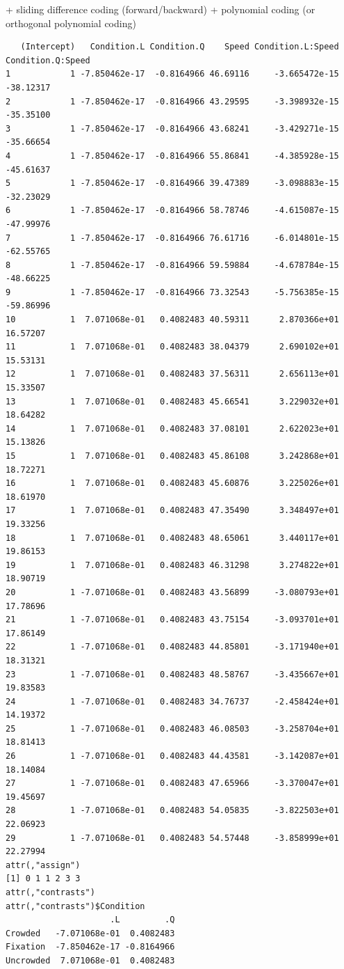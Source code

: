 \documentclass[
]{article}
\begin{document}
\normalsize + sliding difference coding (forward/backward) + polynomial
coding (or orthogonal polynomial coding)

\footnotesize

\begin{verbatim}
   (Intercept)   Condition.L Condition.Q    Speed Condition.L:Speed Condition.Q:Speed
1            1 -7.850462e-17  -0.8164966 46.69116     -3.665472e-15         -38.12317
2            1 -7.850462e-17  -0.8164966 43.29595     -3.398932e-15         -35.35100
3            1 -7.850462e-17  -0.8164966 43.68241     -3.429271e-15         -35.66654
4            1 -7.850462e-17  -0.8164966 55.86841     -4.385928e-15         -45.61637
5            1 -7.850462e-17  -0.8164966 39.47389     -3.098883e-15         -32.23029
6            1 -7.850462e-17  -0.8164966 58.78746     -4.615087e-15         -47.99976
7            1 -7.850462e-17  -0.8164966 76.61716     -6.014801e-15         -62.55765
8            1 -7.850462e-17  -0.8164966 59.59884     -4.678784e-15         -48.66225
9            1 -7.850462e-17  -0.8164966 73.32543     -5.756385e-15         -59.86996
10           1  7.071068e-01   0.4082483 40.59311      2.870366e+01          16.57207
11           1  7.071068e-01   0.4082483 38.04379      2.690102e+01          15.53131
12           1  7.071068e-01   0.4082483 37.56311      2.656113e+01          15.33507
13           1  7.071068e-01   0.4082483 45.66541      3.229032e+01          18.64282
14           1  7.071068e-01   0.4082483 37.08101      2.622023e+01          15.13826
15           1  7.071068e-01   0.4082483 45.86108      3.242868e+01          18.72271
16           1  7.071068e-01   0.4082483 45.60876      3.225026e+01          18.61970
17           1  7.071068e-01   0.4082483 47.35490      3.348497e+01          19.33256
18           1  7.071068e-01   0.4082483 48.65061      3.440117e+01          19.86153
19           1  7.071068e-01   0.4082483 46.31298      3.274822e+01          18.90719
20           1 -7.071068e-01   0.4082483 43.56899     -3.080793e+01          17.78696
21           1 -7.071068e-01   0.4082483 43.75154     -3.093701e+01          17.86149
22           1 -7.071068e-01   0.4082483 44.85801     -3.171940e+01          18.31321
23           1 -7.071068e-01   0.4082483 48.58767     -3.435667e+01          19.83583
24           1 -7.071068e-01   0.4082483 34.76737     -2.458424e+01          14.19372
25           1 -7.071068e-01   0.4082483 46.08503     -3.258704e+01          18.81413
26           1 -7.071068e-01   0.4082483 44.43581     -3.142087e+01          18.14084
27           1 -7.071068e-01   0.4082483 47.65966     -3.370047e+01          19.45697
28           1 -7.071068e-01   0.4082483 54.05835     -3.822503e+01          22.06923
29           1 -7.071068e-01   0.4082483 54.57448     -3.858999e+01          22.27994
attr(,"assign")
[1] 0 1 1 2 3 3
attr(,"contrasts")
attr(,"contrasts")$Condition
                     .L         .Q
Crowded   -7.071068e-01  0.4082483
Fixation  -7.850462e-17 -0.8164966
Uncrowded  7.071068e-01  0.4082483
\end{verbatim}
\end{document}

